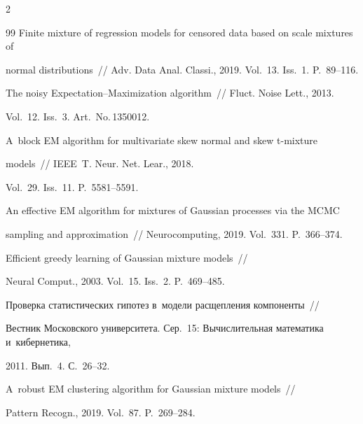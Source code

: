 \begin{multicols}{2}
{{\begin{thebibliography}{99}
Finite mixture of regression models for censored data based on scale mixtures of 

normal distributions~// Adv. Data Anal. Classi., 2019. Vol.~13. Iss.~1. P.~89--116.



  

The noisy Expectation--Maximization algorithm~// Fluct. Noise Lett., 2013. 

Vol.~12. Iss.~3. Art.~No.\,1350012.



  

A~block EM algorithm for multivariate skew normal and skew t-mixture

models~// IEEE~T. Neur. Net. Lear., 2018. 

Vol.~29. Iss.~11. P.~5581--5591.



  

An effective EM algorithm for mixtures of Gaussian processes via the MCMC 

sampling and approximation~// Neurocomputing, 2019. Vol.~331. P.~366--374.



  

Efficient greedy learning of Gaussian mixture models~// 

Neural Comput., 2003. Vol.~15. Iss.~2. P.~469--485.



  

Проверка статистических гипотез в~модели расщепления компоненты~// 

Вестник Мос\-ков\-ско\-го университета. Сер.~15: Вычислительная математика и~кибернетика, 

2011. Вып.~4. С.~26--32.



   

A~robust EM clustering algorithm for Gaussian mixture models~// 

Pattern Recogn., 2019. Vol.~87. P.~269--284.



   


\end{thebibliography}}}
\end{multicols}
